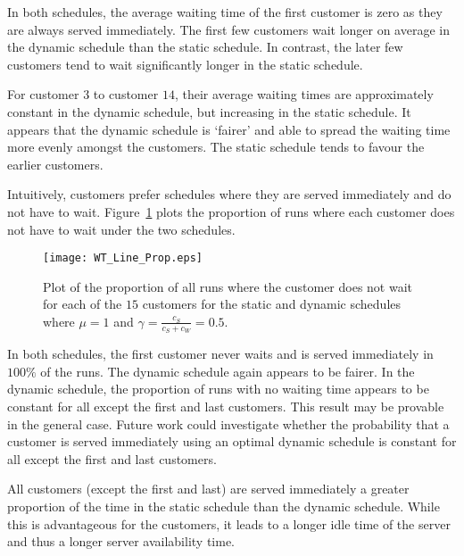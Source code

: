 In both schedules, the average waiting time of the first customer is zero as they are always served immediately. The first few customers wait longer on average in the dynamic schedule than the static schedule. In contrast, the later few customers tend to wait significantly longer in the static schedule.

For customer $3$ to customer $14$, their average waiting times are approximately constant in the dynamic schedule, but increasing in the static schedule. It appears that the dynamic schedule is `fairer' and able to spread the waiting time more evenly amongst the customers. The static schedule tends to favour the earlier customers.

Intuitively, customers prefer schedules where they are served immediately and do not have to wait. Figure~\ref{fig:No_Wait_Position} plots the proportion of runs where each customer does not have to wait under the two schedules.
\begin{figure}[htb]
	\centering
	\texttt{[image: WT\_Line\_Prop.eps]}
	\caption{Plot of the proportion of all runs where the customer does not wait for each of the $15$ customers for the static and dynamic schedules where $\mu = 1$ and $\gamma = \frac{c_{S}}{c_{S} + c_{W}} = 0.5$.}
	\label{fig:No_Wait_Position}
\end{figure}

In both schedules, the first customer never waits and is served immediately in $100 \%$ of the runs. The dynamic schedule again appears to be fairer. In the dynamic schedule, the proportion of runs with no waiting time appears to be constant for all except the first and last customers. This result may be provable in the general case. Future work could investigate whether the probability that a customer is served immediately using an optimal dynamic schedule is constant for all except the first and last customers.

All customers (except the first and last) are served immediately a greater proportion of the time in the static schedule than the dynamic schedule. While this is advantageous for the customers, it leads to a longer idle time of the server and thus a longer server availability time.

